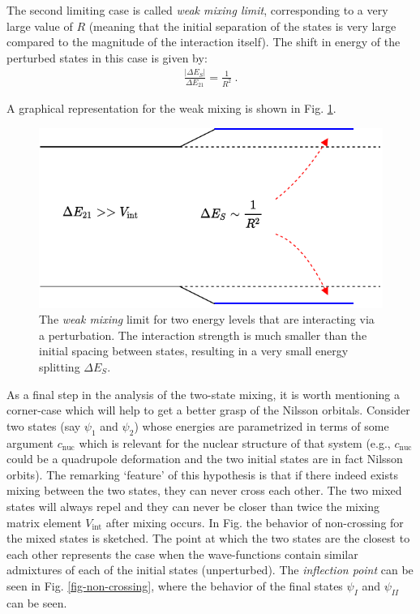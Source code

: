 The second limiting case is called \emph{weak mixing limit}, corresponding to a very large value of $R$ (meaning that the initial separation of the states is very large compared to the magnitude of the interaction itself). The shift in energy of the perturbed states in this case is given by:
\begin{align}
    \frac{|\Delta E_S|}{\Delta E_{21}}=\frac{1}{R^2}\ .
\end{align}

A graphical representation for the weak mixing is shown in Fig. \ref{weak-mixing-fig}.

\begin{figure}
    \centering
    \includegraphics[scale=0.95]{Chapters/Figures/mixing_weak_coupling.pdf}
    \caption{The \emph{weak mixing} limit for two energy levels that are interacting via a perturbation. The interaction strength is much smaller than the initial spacing between states, resulting in a very small energy splitting $\Delta E_{S}$.}
    \label{weak-mixing-fig}
\end{figure}

As a final step in the analysis of the two-state mixing, it is worth mentioning a corner-case which will help to get a better grasp of the Nilsson orbitals. Consider two states (say $\psi_1$ and $\psi_2$) whose energies are parametrized in terms of some argument $c_\text{nuc}$ which is relevant for the nuclear structure of that system (e.g., $c_\text{nuc}$ could be a quadrupole deformation and the two initial states are in fact Nilsson orbits). The remarking `feature' of this hypothesis is that if there indeed exists mixing between the two states, they can never cross each other. The two mixed states will always repel and they can never be closer than twice the mixing matrix element $V_\text{int}$ after mixing occurs. In Fig. the behavior of non-crossing for the mixed states is sketched.
The point at which the two states are the closest to each other represents the case when the wave-functions contain similar admixtures of each of the initial states (unperturbed). The \emph{inflection point} can be seen in Fig. \ref{fig-non-crossing}, where the behavior of the final states $\psi_I$ and $\psi_{II}$ can be seen.

